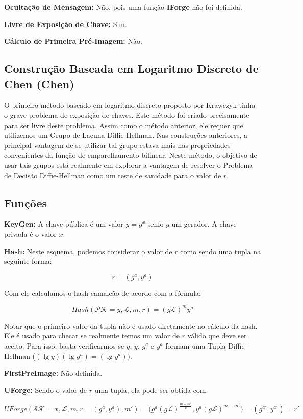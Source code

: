 \documentclass[a4paper]{article}
\begin{document}
\textbf{Ocultação de Mensagem: }Não, pois uma função \textbf{IForge}
não foi definida.

\textbf{Livre de Exposição de Chave: } Sim.

\textbf{Cálculo de Primeira Pré-Imagem: }Não.

\subsection{Construção Baseada em Logaritmo Discreto de Chen (Chen)
  \cite{chen}}

O primeiro método baseado em logaritmo discreto proposto por Krawczyk
tinha o grave problema de exposição de chaves. Este método foi criado
precisamente para ser livre deste problema. Assim como o método
anterior, ele requer que utilizemos um Grupo de Lacuna
Diffie-Hellman. Nas construções anteriores, a principal vantagem de se
utilizar tal grupo estava mais nas propriedades convenientes da função
de emparelhamento bilinear. Neste método, o objetivo de usar tais
grupos está realmente em explorar a vantagem de resolver o Problema de
Decisão Diffie-Hellman como um teste de sanidade para o valor de $r$.

\subsection{Funções}

\textbf{KeyGen: }A chave pública é um valor $y=g^x$ senfo $g$ um
gerador. A chave privada é o valor $x$.

\textbf{Hash: }Neste esquema, podemos considerar o valor de $r$ como
sendo uma tupla na seguinte forma:

$$
r = (g^a, y^a)
$$

Com ele calculamos o hash camaleão de acordo com a fórmula:

$$
Hash(\mathcal{PK}=y, \mathcal{L}, m, r) = (g\mathcal{L})^my^a
$$

Notar que o primeiro valor da tupla não é usado diretamente no cálculo
da hash. Ele é usado para checar se realmente temos um valor de $r$
válido que deve ser aceito. Para isso, basta verificarmos se $g$, $y$,
$g^a$ e $y^a$ formam uma Tupla Diffie-Hellman ($(\lg y)(\lg g^a) =(\lg
y^a)$).

\textbf{FirstPreImage:} Não definida.

\textbf{UForge:} Sendo o valor de $r$ uma tupla, ela pode ser obtida
com:

$$UForge(\mathcal{SK}=x, \mathcal{L}, m, r=(g^a,y^a), m') =
\big(g^a(g\mathcal{L})^{\frac{m-m'}{x}}, y^a(g\mathcal{L})^{m-m'}\big) =
(g^{a'}, y^{a'}) = r'
$$
\end{document}
